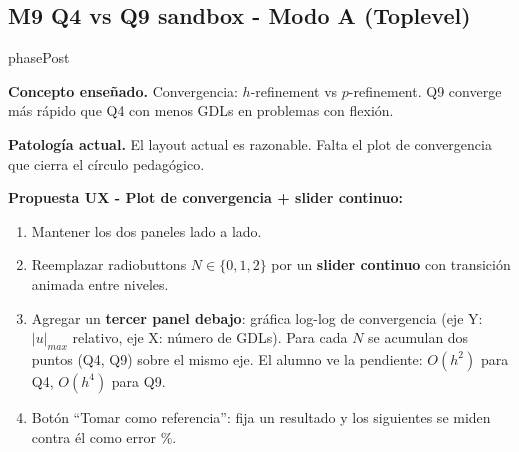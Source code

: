 \documentclass[11pt,a4paper]{article}
\begin{document}
\subsection{M9 \textbar{} Q4 vs Q9 sandbox - Modo A (Toplevel)}

\begin{moduleBox}{phasePost}

\textbf{Concepto enseñado.} Convergencia: $h$-refinement vs $p$-refinement.
Q9 converge más rápido que Q4 con menos GDLs en problemas con flexión.

\textbf{Patología actual.} El layout actual es razonable. Falta el plot
de convergencia que cierra el círculo pedagógico.

\textbf{Propuesta UX - Plot de convergencia + slider continuo:}
\begin{enumerate}[leftmargin=1.2em, itemsep=2pt]
  \item Mantener los dos paneles lado a lado.
  \item Reemplazar radiobuttons $N \in \{0, 1, 2\}$ por un \textbf{slider
        continuo} con transición animada entre niveles.
  \item Agregar un \textbf{tercer panel debajo}: gráfica log-log de
        convergencia (eje Y: $|u|_{max}$ relativo, eje X: número de GDLs).
        Para cada $N$ se acumulan dos puntos (Q4, Q9) sobre el mismo eje.
        El alumno ve la pendiente: $O(h^2)$ para Q4, $O(h^4)$ para Q9.
  \item Botón ``Tomar como referencia'': fija un resultado y los siguientes
        se miden contra él como error \%.
\end{enumerate}

\begin{center}
\end{center}
\end{moduleBox}
\end{document}
